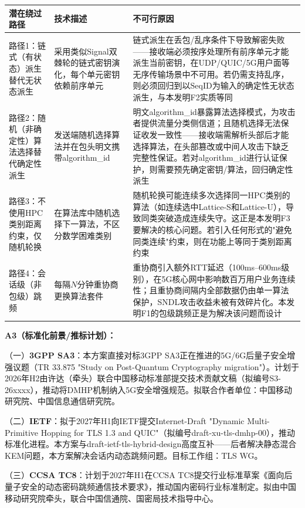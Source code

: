 ﻿\documentclass[12pt,a4paper]{article}
\begin{document}
{{\begin{tabular}{|p{3.0cm}|p{5.0cm}|p{6.0cm}|}
\hline
\textbf{潜在绕过路径} & \textbf{技术描述} & \textbf{不可行原因} \\
\hline
路径1：链式（有状态）派生替代无状态派生 & 采用类似Signal双棘轮的链式密钥演化，每个单元密钥依赖前序单元 & 链式派生在丢包/乱序条件下导致解密失败——接收端必须按序处理所有前序单元才能派生当前密钥，在UDP/QUIC/5G用户面等无序传输场景中不可用。若仍需支持乱序，则必须回归到以$\text{SeqID}$为输入的确定性无状态派生，与本发明F2实质等同 \\
\hline
路径2：随机（非确定性）算法选择替代确定性派生 & 发送端随机选择算法并在包头明文携带algorithm\_id & 明文algorithm\_id暴露算法选择模式，为攻击者提供流量分类侧信道；且随机选择无法保证收发一致性——接收端需解析头部后才能选择算法，在头部篡改或中间人攻击下缺乏完整性保证。若对algorithm\_id进行认证保护，则需要预先确定密钥/算法，回归确定性派生 \\
\hline
路径3：不使用HPC类别距离约束，仅随机轮换 & 在算法库中随机选择下一算法，不区分数学困难类别 & 随机轮换可能连续多次选择同一HPC类别的算法（如连续选中Lattice-S和Lattice-U），导致同类突破造成连续失守。这正是本发明F3要解决的核心问题。若引入任何形式的"避免同类连续"约束，则在功能上等同于类别距离约束 \\
\hline
路径4：会话级（非包级）跳频 & 每隔$N$分钟重协商更换算法套件 & 重协商引入额外RTT延迟（100ms--600ms级别），在5G核心网中影响数百万用户业务连续性；且重协商间隔内全部数据仍由单一算法保护，SNDL攻击收益未被有效碎片化。本发明F1的包级跳频正是为解决该问题而设计 \\
\hline
\end{tabular}

\textbf{A3（标准化前景/推标计划）：}

（一）\textbf{3GPP SA3}：本方案直接对标3GPP SA3正在推进的5G/6G后量子安全增强议题（TR 33.875 "Study on Post-Quantum Cryptography migration"）。计划于2026年H2由许达（牵头）联合中国移动标准部提交技术贡献文稿（拟编号S3-26xxxx），推动将DMHP机制纳入5G安全增强规范。拟联合作者单位：中国移动研究院、中国信息通信研究院。

（二）\textbf{IETF}：拟于2027年H1向IETF提交Internet-Draft "Dynamic Multi-Primitive Hopping for TLS 1.3 and QUIC"（拟编号draft-xu-tls-dmhp-00），推动标准化进程。本方案与draft-ietf-tls-hybrid-design高度互补——后者解决静态混合KEM问题，本方案解决会话内动态跳频问题。目标工作组：TLS WG。

（三）\textbf{CCSA TC8}：计划于2027年H1在CCSA TC8提交行业标准草案《面向后量子安全的动态密码跳频通信技术要求》，推动国内密码行业标准制定。拟由中国移动研究院牵头，联合中国信通院、国密局技术指导中心。

}}
\end{document}

